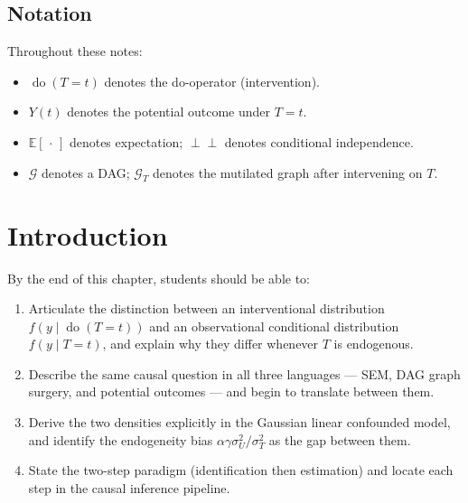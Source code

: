 \documentclass[
  a4paper,
]{book}
\providecommand{\tightlist}{%
  \setlength{\itemsep}{0pt}\setlength{\parskip}{0pt}}
\newcommand{\doop}{\operatorname{do}}
\newcommand{\indep}{\perp\!\!\!\perp}
\newcommand{\E}{\mathbb{E}}
\begin{document}
\section*{Notation}\label{notation}


Throughout these notes:

\begin{itemize}
\tightlist
\item
  \(\doop(T = t)\) denotes the do-operator (intervention).
\item
  \(Y(t)\) denotes the potential outcome under \(T = t\).
\item
  \(\E[\,\cdot\,]\) denotes expectation; \(\indep\) denotes conditional
  independence.
\item
  \(\mathcal{G}\) denotes a DAG; \(\mathcal{G}_T\) denotes the mutilated
  graph after intervening on \(T\).
\end{itemize}


\chapter{Introduction}\label{introduction}

\begin{tcolorbox}[enhanced jigsaw, arc=.35mm, bottomrule=.15mm, bottomtitle=1mm, breakable, colback=white, colbacktitle=quarto-callout-note-color!10!white, colframe=quarto-callout-note-color-frame, coltitle=black, left=2mm, leftrule=.75mm, opacityback=0, opacitybacktitle=0.6, rightrule=.15mm, title={Learning Objectives}, titlerule=0mm, toprule=.15mm, toptitle=1mm]

By the end of this chapter, students should be able to:

\begin{enumerate}
\def\labelenumi{\arabic{enumi}.}
\tightlist
\item
  Articulate the distinction between an interventional distribution
  \(f(y \mid \doop(T{=}t))\) and an observational conditional
  distribution \(f(y \mid T{=}t)\), and explain why they differ whenever
  \(T\) is endogenous.
\item
  Describe the same causal question in all three languages --- SEM, DAG
  graph surgery, and potential outcomes --- and begin to translate
  between them.
\item
  Derive the two densities explicitly in the Gaussian linear confounded
  model, and identify the endogeneity bias
  \(\alpha\gamma\sigma_U^2/\sigma_T^2\) as the gap between them.
\item
  State the two-step paradigm (identification then estimation) and
  locate each step in the causal inference pipeline.
\end{enumerate}

\end{tcolorbox}
\end{document}
